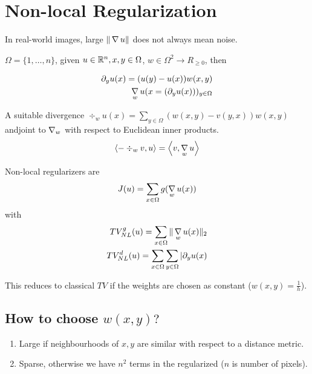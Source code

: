 \section{Non-local Regularization}
\label{sec:non-local-regul}

In real-world images, large $\| \operatorname*{\nabla} u \|$ does not always mean
noise.

\begin{defn}
  \label{defn:total_variation:1}
  $\Omega = \{ 1, \dots, n \}$, given $u \in \mathbb{R}^{n}, x, y \in \Omega$,
  $w \in \Omega^{2} \rightarrow R_{\geq 0}$, then 

  \begin{align}
    \label{eq:105}
    \partial_{y} u(x) = (u(y) - u(x)) w(x, y) \\
    \operatorname*{\nabla}_{w} u(x = (\partial_{y} u(x)))_{y \in \Omega}
  \end{align}

  A suitable divergence $\div_{w} u(x) = \sum_{y \in \Omega} (w(x, y) -
  v(y, x)) w(x, y)$ andjoint to $\operatorname*{\nabla}_{w}$ with respect to Euclidean
  inner products.
  \begin{align}
    \label{eq:106}
    \IP{- \div_{w} v, u} = \IP{v, \grad_{w} u}
  \end{align}

  Non-local regularizers are
  \begin{align}
    \label{eq:107}
    J(u) = \sum_{x \in \Omega} g(\operatorname*{\nabla}_{w} u(x))
  \end{align} with
  \begin{align}
    \label{eq:108}
    TV_{NL}^{g}(u) = \sum_{x \in \Omega} \| \operatorname*{\nabla}_{w} u(x) \|_{2} \\
    TV_{NL}^{d}(u) = \sum_{x \in \Omega} \sum_{y \in \Omega}
    | \partial_{y} u(x)
  \end{align}
\end{defn}

This reduces to classical $TV$ if the weights are chosen as constant
($w(x, y) = \frac{1}{h}$).

\subsection{How to choose $w(x, y)?$}
\label{sec:how-choose-wx}

\begin{enumerate}
\item Large if neighbourhoods of $x, y$ are similar with respect to a
  distance metric.
\item Sparse, otherwise we have $n^{2}$ terms in the regularized ($n$
  is number of pixels).
\end{enumerate}

